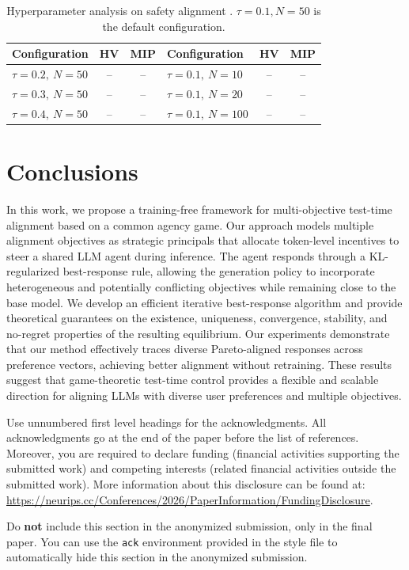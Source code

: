 \documentclass{article}
\begin{document}
\begin{table}[h]
\vspace{-5pt}
\centering
\caption{Hyperparameter analysis on safety alignment . \(\tau=0.1, N=50\) is the default configuration.}
\vspace{3pt}
\small
\begin{tabular}{lcc|lcc}
\toprule
\textbf{Configuration} & \textbf{HV} & \textbf{MIP}
& \textbf{Configuration} & \textbf{HV} & \textbf{MIP} \\
\midrule
$\tau=0.2,\ N=50$  & -- & -- 
& $\tau=0.1,\ N=10$  & -- & -- \\
$\tau=0.3,\ N=50$  & -- & -- 
& $\tau=0.1,\ N=20$  & -- & -- \\
$\tau=0.4,\ N=50$  & -- & -- 
& $\tau=0.1,\ N=100$ & -- & -- \\
\bottomrule
\end{tabular}
\label{tab:hyperparameter_sensitivity}
\vspace{-8pt}
\end{table}

\section{Conclusions}
\label{sec:conclusion}

In this work, we propose a training-free framework for multi-objective test-time alignment based on a common agency game. Our approach models multiple alignment objectives as strategic principals that allocate token-level incentives to steer a shared LLM agent during inference. The agent responds through a KL-regularized best-response rule, allowing the generation policy to incorporate heterogeneous and potentially conflicting objectives while remaining close to the base model. We develop an efficient iterative best-response algorithm and provide theoretical guarantees on the existence, uniqueness, convergence, stability, and no-regret properties of the resulting equilibrium. Our experiments demonstrate that our method effectively traces diverse Pareto-aligned responses across preference vectors, achieving better alignment without retraining. These results suggest that game-theoretic test-time control provides a flexible and scalable direction for aligning LLMs with diverse user preferences and multiple objectives.


\begin{ack}
Use unnumbered first level headings for the acknowledgments. All acknowledgments
go at the end of the paper before the list of references. Moreover, you are required to declare
funding (financial activities supporting the submitted work) and competing interests (related financial activities outside the submitted work).
More information about this disclosure can be found at: \url{https://neurips.cc/Conferences/2026/PaperInformation/FundingDisclosure}.


Do {\bf not} include this section in the anonymized submission, only in the final paper. You can use the \texttt{ack} environment provided in the style file to automatically hide this section in the anonymized submission.
\end{ack}
\end{document}
